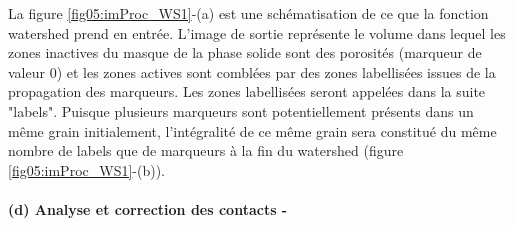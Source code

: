 		La figure \ref{fig05:imProc_WS1}-(a) est une schématisation de ce que la fonction watershed prend en entrée. L'image de sortie représente le volume dans lequel les zones inactives du masque de la phase solide sont des porosités (marqueur de valeur \num{0}) et les zones actives sont comblées par des zones labellisées issues de la propagation des marqueurs. Les zones labellisées seront appelées dans la suite "labels". Puisque plusieurs marqueurs sont potentiellement présents dans un même grain initialement, l'intégralité de ce même grain sera constitué du même nombre de labels que de marqueurs à la fin du watershed (figure \ref{fig05:imProc_WS1}-(b)).
		
	\paragraph{(d) Analyse et correction des contacts -}
